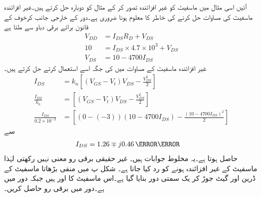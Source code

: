 آئیں اسی مثال میں ماسفیٹ کو غیر افزائندہ تصور کر کے مثال کو دوبارہ حل کرتے ہیں۔غیر افزائندہ ماسفیٹ کی مساوات حل کرنے کی خاطر   کا معلوم ہونا ضروری ہے۔دور کے خارجی جانب کرخوف کے قانون برائے برقی دباو سے ملتا ہے
\begin{align*}
V_{DD}&=I_{DS} R_D+V_{DS}\\
10&=I_{DS} \times 4.7 \times 10^{3}+V_{DS}\\
V_{DS}&=10-4700 I_{DS}
\end{align*}
غیر افزائندہ ماسفیٹ کے مساوات میں  کی جگہ اسے استعمال کرتے حل کرتے ہیں۔
\begin{align*}
I_{DS}&=k_n \left[\left(V_{GS}-V_t \right )V_{DS} -\frac{V_{DS}^{2}}{2}\right ]\\
\frac{I_{DS}}{k_n}&=\left[\left(V_{GS}-V_t \right )V_{DS} -\frac{V_{DS}^{2}}{2}\right ]\\
\frac{I_{DS}}{0.2 \times 10^{-3}}&=\left[\left(0-(-3) \right ) \left(10-4700 I_{DS} \right )- \frac{\left( 10-4700 I_{DS} \right )^{2}}{2}\right]
\end{align*}
سے
\begin{align*}
I_{DS}&=1.26\mp j 0.46 \,{\milli \ampere}
\end{align*}
حاصل ہوتا ہے۔یہ مخلوط جوابات ہیں۔ غیر حقیقی برقی رو معنی نہیں رکھتی لہٰذا ماسفیٹ کے غیر افزائندہ ہونے کو رد کیا جاتا ہے۔
 
شکل  پ میں منفی بڑھاتا ماسفیٹ کے ڈرین اور گیٹ جوڑ کر یک سمتی دور بنایا گیا ہے۔اس ماسفیٹ کا  اور  ہیں  جبکہ دور میں   ہے۔دور میں برقی رو حاصل کریں۔

